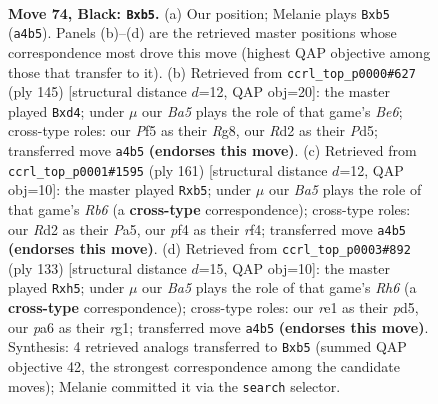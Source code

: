 \documentclass[11pt]{article}
\begin{document}
\clearpage

\begin{figure}[p]\centering
\begin{subfigure}{0.46\textwidth}\centering
\resizebox{\linewidth}{!}{%
\newchessgame
\chessboard[
  setfen={8/p7/P6k/1P3p2/b4P2/8/3r4/4R1K1 b - - 0 74},
  showmover=false,
  pgfstyle=straightmove, color=movearrow, markmove={a4-b5}
]}
\caption{}
\end{subfigure}\hfill
\begin{subfigure}{0.46\textwidth}\centering
\resizebox{\linewidth}{!}{%
\newchessgame
\chessboard[
  setfen={6r1/8/4R3/1P1pP2k/3P4/1K2b2P/8/8 b - - 0 73},
  showmover=false,
  pgfstyle=straightmove, color=movearrow, markmove={e3-d4}
]}
\caption{}
\end{subfigure}
\\[4pt]
\begin{subfigure}{0.46\textwidth}\centering
\resizebox{\linewidth}{!}{%
\newchessgame
\chessboard[
  setfen={8/6k1/3p4/pP1P3K/4PR2/1r6/8/8 b - - 0 81},
  showmover=false,
  pgfstyle=straightmove, color=movearrow, markmove={b3-b5}
]}
\caption{}
\end{subfigure}\hfill
\begin{subfigure}{0.46\textwidth}\centering
\resizebox{\linewidth}{!}{%
\newchessgame
\chessboard[
  setfen={1k6/8/3p4/3P3P/4PK2/7r/2p5/6R1 b - - 1 67},
  showmover=false,
  pgfstyle=straightmove, color=movearrow, markmove={h3-h5}
]}
\caption{}
\end{subfigure}
\caption{\textbf{Move 74, Black: \texttt{Bxb5}.} (a) Our position; Melanie plays \texttt{Bxb5} (\texttt{a4b5}). Panels (b)--(d) are the retrieved master positions whose correspondence most drove this move (highest QAP objective among those that transfer to it). (b) Retrieved from \texttt{ccrl\_top\_p0000\#627} (ply 145) [structural distance $d$=12, QAP obj=20]: the master played \texttt{Bxd4}; under $\mu$ our \emph{Ba5} plays the role of that game's \emph{Be6}; cross-type roles: our \emph{P}f5 as their \emph{R}g8, our \emph{R}d2 as their \emph{P}d5; transferred move \texttt{a4b5} \textbf{(endorses this move)}. (c) Retrieved from \texttt{ccrl\_top\_p0001\#1595} (ply 161) [structural distance $d$=12, QAP obj=10]: the master played \texttt{Rxb5}; under $\mu$ our \emph{Ba5} plays the role of that game's \emph{Rb6} (a \textbf{cross-type} correspondence); cross-type roles: our \emph{R}d2 as their \emph{P}a5, our \emph{p}f4 as their \emph{r}f4; transferred move \texttt{a4b5} \textbf{(endorses this move)}. (d) Retrieved from \texttt{ccrl\_top\_p0003\#892} (ply 133) [structural distance $d$=15, QAP obj=10]: the master played \texttt{Rxh5}; under $\mu$ our \emph{Ba5} plays the role of that game's \emph{Rh6} (a \textbf{cross-type} correspondence); cross-type roles: our \emph{r}e1 as their \emph{p}d5, our \emph{p}a6 as their \emph{r}g1; transferred move \texttt{a4b5} \textbf{(endorses this move)}. Synthesis: 4 retrieved analogs transferred to \texttt{Bxb5} (summed QAP objective 42, the strongest correspondence among the candidate moves); Melanie committed it via the \texttt{search} selector.}
\label{fig:thought-m147}
\end{figure}
\end{document}
